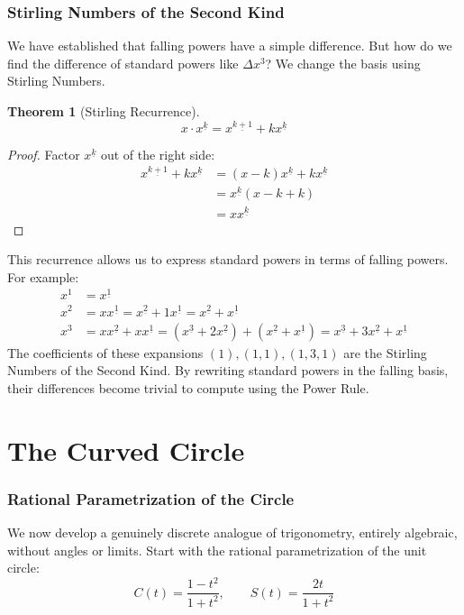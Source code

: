 \documentclass[12pt]{article}
\newtheorem{theorem}{Theorem}
\newcommand{\falling}[2]{{#1}^{\underline{#2}}}
\begin{document}
\section{Stirling Numbers of the Second Kind}

We have established that falling powers have a simple difference. But how do we find the difference of standard powers like $\Delta x^3$? We change the basis using Stirling Numbers.

\begin{theorem}[Stirling Recurrence]
\[ x \cdot \falling{x}{k} = \falling{x}{k+1} + k \falling{x}{k} \]
\end{theorem}

\begin{proof}
Factor $\falling{x}{k}$ out of the right side:
\begin{align*}
    \falling{x}{k+1} + k \falling{x}{k} &= (x-k)\falling{x}{k} + k \falling{x}{k} \\
    &= \falling{x}{k}(x - k + k) \\
    &= x \falling{x}{k}
\end{align*}
\end{proof}

This recurrence allows us to express standard powers in terms of falling powers. For example:
\begin{align*}
    x^1 &= \falling{x}{1} \\
    x^2 &= x \falling{x}{1} = \falling{x}{2} + 1\falling{x}{1} = \falling{x}{2} + \falling{x}{1} \\
    x^3 &= x \falling{x}{2} + x \falling{x}{1} = (\falling{x}{3} + 2\falling{x}{2}) + (\falling{x}{2} + \falling{x}{1}) = \falling{x}{3} + 3\falling{x}{2} + \falling{x}{1}
\end{align*}
The coefficients of these expansions $(1), (1, 1), (1, 3, 1)$ are the Stirling Numbers of the Second Kind. By rewriting standard powers in the falling basis, their differences become trivial to compute using the Power Rule.

\part{The Curved Circle}

\section{Rational Parametrization of the Circle}

We now develop a genuinely discrete analogue of trigonometry, entirely algebraic, without angles or limits. Start with the rational parametrization of the unit circle:
\[ C(t) = \frac{1-t^2}{1+t^2}, \qquad S(t) = \frac{2t}{1+t^2} \]
\end{document}
